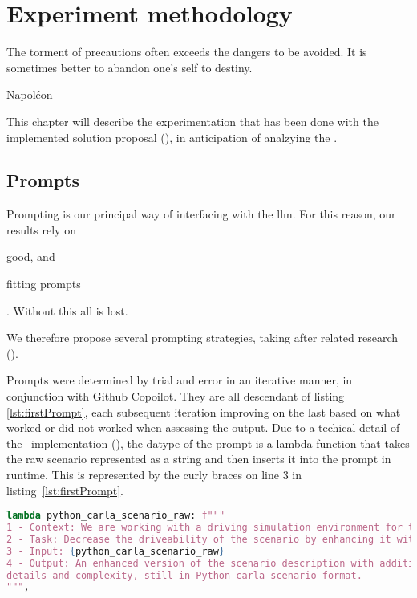 \chapter{Experiment methodology}\label{sec:experiments}

\epigraph{The torment of precautions often exceeds the dangers to be avoided. It is sometimes better to abandon one's self to destiny.}{Napoléon}

This chapter will describe the experimentation that has been done with the implemented solution
proposal (), in anticipation of analzying the .

\section{Prompts}

Prompting is our principal way of interfacing with the \acrshort{llm}. For this reason, our results
rely on \begin{inparaenum}
    \item good, and
    \item fitting prompts
\end{inparaenum}. Without this all is lost.

We therefore propose several prompting strategies, taking after related research
().

Prompts were determined by trial and error in an iterative manner, in
conjunction with Github Copoilot. They are all descendant of listing
\ref{lst:firstPrompt}, each subsequent iteration improving on the last based on
what worked or did not worked when assessing the output.
Due to a techical detail of the
\hefe~implementation (), the datype of the prompt is
a lambda function that takes the raw scenario represented as a string and then
inserts it into the prompt in runtime. This is represented by the curly braces
on line \num{3} in listing~\ref{lst:firstPrompt}.

\begin{lstlisting}[caption={The first prompt.}, label={lst:firstPrompt}, language={Python}]
lambda python_carla_scenario_raw: f"""
1 - Context: We are working with a driving simulation environment for the Carla simulator.
2 - Task: Decrease the driveability of the scenario by enhancing it with more details and complexity.
3 - Input: {python_carla_scenario_raw}
4 - Output: An enhanced version of the scenario description with additional
details and complexity, still in Python carla scenario format.
""",
\end{lstlisting}


